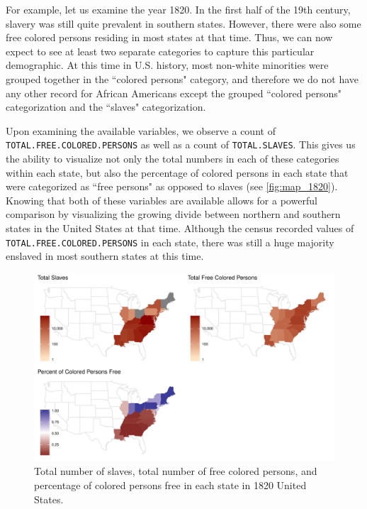 \documentclass[DIV=calc, paper=a4, fontsize=10pt, twocolumn]{scrartcl}\usepackage[]{graphicx}\usepackage[]{color}
\newenvironment{knitrout}{}{} %
\begin{document}
\par For example, let us examine the year 1820. In the first half of the 19th century, slavery was still quite prevalent in southern states. However, there were also some free colored persons residing in most states at that time. Thus, we can now expect to see at least two separate categories to capture this particular demographic. At this time in U.S. history, most non-white minorities were grouped together in the ``colored persons" category, and therefore we do not have any other record for African Americans except the grouped ``colored persons" categorization and the ``slaves" categorization. 

\par Upon examining the available variables, we observe a count of \texttt{TOTAL.FREE.COLORED.PERSONS} as well as a count of \texttt{TOTAL.SLAVES}. This gives us the ability to visualize not only the total numbers in each of these categories within each state, but also the percentage of colored persons in each state that were categorized as ``free persons" as opposed to slaves (see \autoref{fig:map_1820}). Knowing that both of these variables are available allows for a powerful comparison by visualizing the growing divide between northern and southern states in the United States at that time. Although the census recorded values of \texttt{TOTAL.FREE.COLORED.PERSONS} in each state, there was still a huge majority enslaved in most southern states at this time.  


\begin{knitrout}
\color{fgcolor}\begin{figure}[h]
\includegraphics[width=.5\textwidth]{figure/map_1820-1} \caption[Total number of slaves, total number of free colored persons, and percentage of colored persons free in each state in 1820 United States]{Total number of slaves, total number of free colored persons, and percentage of colored persons free in each state in 1820 United States.}\label{fig:map_1820}
\end{figure}


\end{knitrout}
\end{document}
